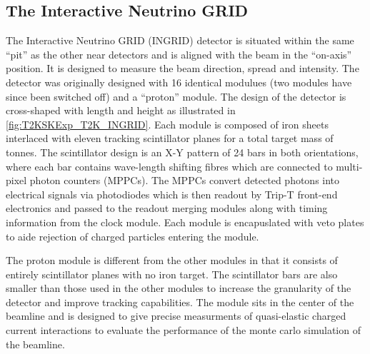 \subsection{The Interactive Neutrino GRID}
\label{subsec:T2KSKExp_T2K_INGRID}

The Interactive Neutrino GRID (INGRID) detector is situated within the same ``pit'' as the other near detectors and is aligned with the beam in the ``on-axis'' position. It is designed to measure the beam direction, spread and intensity. The detector was originally designed with 16 identical modulues \cite{t2k_det} (two modules have since been switched off) and a ``proton'' module. The design of the detector is cross-shaped with length and height  as illustrated in \autoref{fig:T2KSKExp_T2K_INGRID}. Each module is composed of iron sheets interlaced with eleven tracking scintillator planes for a total target mass of  tonnes. The scintillator design is an X-Y pattern of 24 bars in both orientations, where each bar contains wave-length shifting fibres which are connected to multi-pixel photon counters (MPPCs). The MPPCs convert detected photons into electrical signals via photodiodes which is then readout by Trip-T front-end electronics \cite{Yokoyama2010} and passed to the readout merging modules along with timing information from the clock module. Each module is encapuslated with veto plates to aide rejection of charged particles entering the module.

The proton module is different from the other modules in that it consists of entirely scintillator planes with no iron target. The scintillator bars are also smaller than those used in the other modules to increase the granularity of the detector and improve tracking capabilities. The module sits in the center of the beamline and is designed to give precise measurments of quasi-elastic charged current interactions to evaluate the performance of the monte carlo simulation of the beamline. 

